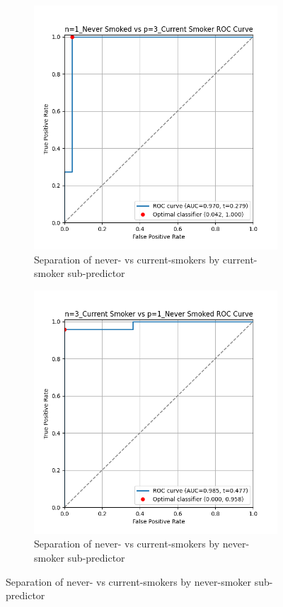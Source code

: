 \documentclass{article}
\begin{document}
\begin{figure}
    \begin{subfigure}{0.43\textwidth}
        \centering
        \includegraphics[width=\linewidth]{cohort1_1v3_roc.png}
        \caption{Separation of never- vs current-smokers by current-smoker sub-predictor}
    \end{subfigure}
    \hfill
    \begin{subfigure}{0.43\textwidth}
        \centering
        \includegraphics[width=\linewidth]{cohort1_3v1_roc.png}
        \caption{Separation of never- vs current-smokers by never-smoker sub-predictor}
    \end{subfigure}


\end{figure}
\end{document}

